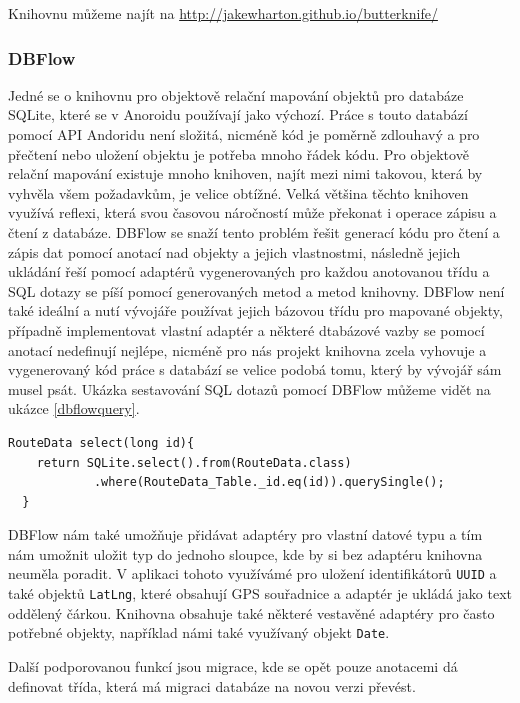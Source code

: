 \documentclass{article}
\begin{document}
Knihovnu můžeme najít na \url{http://jakewharton.github.io/butterknife/}

\subsubsection{DBFlow}\label{dbflow}
Jedné se o knihovnu pro objektově relační mapování objektů pro databáze SQLite, které se v
 Anoroidu používají jako výchozí. Práce s touto databází pomocí API Andoridu není
 složitá, nicméně kód je poměrně zdlouhavý a pro přečtení nebo uložení objektu je potřeba
 mnoho řádek kódu. Pro objektově relační mapování existuje mnoho knihoven, najít mezi nimi takovou,
 která by vyhvěla všem požadavkům, je velice obtížné. Velká většina těchto knihoven využívá reflexi,
 která svou časovou náročností může překonat i operace zápisu a čtení z databáze.
 DBFlow se snaží tento problém řešit generací kódu pro čtení a zápis dat pomocí anotací nad objekty
 a jejich vlastnostmi, následně jejich ukládání řeší pomocí adaptérů vygenerovaných pro každou anotovanou
 třídu a SQL dotazy se píší pomocí generovaných metod a metod knihovny. DBFlow není také ideální
  a nutí vývojáře používat jejich bázovou třídu pro mapované objekty, případně implementovat vlastní
  adaptér a některé dtabázové vazby se pomocí anotací nedefinují nejlépe, nicméně pro nás projekt
  knihovna zcela vyhovuje a vygenerovaný kód práce s databází se velice podobá tomu, který by vývojář
  sám musel psát. Ukázka sestavování SQL dotazů pomocí DBFlow můžeme vidět na ukázce \ref{dbflowquery}.

\begin{lstlisting}[label=dbflowquery,caption=Sestavování SQL dotazů s DBFlow]
  RouteData select(long id){
    return SQLite.select().from(RouteData.class)
            .where(RouteData_Table._id.eq(id)).querySingle();
  }
\end{lstlisting}

  DBFlow nám také umožňuje přidávat adaptéry pro vlastní datové typu a tím nám umožnit uložit
  typ do jednoho sloupce, kde by si bez adaptéru knihovna neuměla poradit. V aplikaci
  tohoto využívámé pro uložení identifikátorů \texttt{UUID} a také objektů \texttt{LatLng},
  které obsahují GPS souřadnice a adaptér je ukládá jako text oddělený čárkou.
  Knihovna obsahuje také některé vestavěné adaptéry pro často potřebné objekty, například námi
  také využívaný objekt \texttt{Date}.

  Další podporovanou funkcí jsou migrace, kde se opět pouze anotacemi dá definovat třída,
  která má migraci databáze na novou verzi převést.
\end{document}

